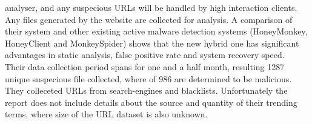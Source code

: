 analyser, and any suspecious URLs will be handled by high interaction clients. 
Any files generated by the website are collected for analysis. A comparison of 
their system and other existing active malware detection systems (HoneyMonkey, 
HoneyClient and MonkeySpider) shows that the new hybrid one has significant 
advantages in static analysis, false positive rate and system recovery speed. 
\\
Their data collection period spans for one and a half month, resulting 1287 
unique suspecious file collected, where of 986 are determined to be malicious. 
They colleceted URLs from search-engines and blacklists. Unfortunately the 
report does not include details about the source and quantity of their 
trending terms, where size of the URL dataset is also unknown. 


